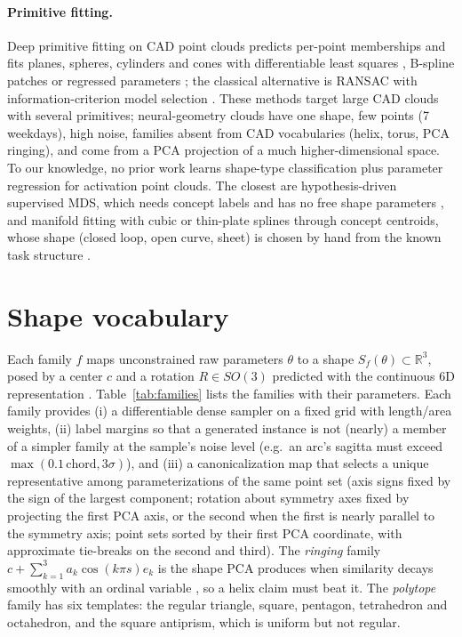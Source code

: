 \documentclass[10pt]{article}
\begin{document}
\paragraph{Primitive fitting.} Deep primitive fitting on CAD point clouds predicts per-point memberships and fits planes, spheres, cylinders and cones with differentiable least squares \citep{li2019spfn}, B-spline patches \citep{sharma2020parsenet} or regressed parameters \citep{yan2021hpnet}; the classical alternative is RANSAC \citep{schnabel2007ransac} with information-criterion model selection \citep{kanatani2004gaic}. These methods target large CAD clouds with several primitives; neural-geometry clouds have one shape, few points (7 weekdays), high noise, families absent from CAD vocabularies (helix, torus, PCA ringing), and come from a PCA projection of a much higher-dimensional space. To our knowledge, no prior work learns shape-type classification plus parameter regression for activation point clouds. The closest are hypothesis-driven supervised MDS, which needs concept labels and has no free shape parameters \citep{tiblias2025smds}, and manifold fitting with cubic or thin-plate splines through concept centroids, whose shape (closed loop, open curve, sheet) is chosen by hand from the known task structure \citep{wurgaft2026manifold}.

\section{Shape vocabulary}
\label{sec:families}
Each family $f$ maps unconstrained raw parameters $\theta$ to a shape $S_f(\theta)\subset\mathbb{R}^3$, posed by a center $c$ and a rotation $R\in SO(3)$ predicted with the continuous 6D representation \citep{zhou2019rotation}. Table~\ref{tab:families} lists the families with their parameters. Each family provides (i) a differentiable dense sampler on a fixed grid with length/area weights, (ii) label margins so that a generated instance is not (nearly) a member of a simpler family at the sample's noise level (e.g.\ an arc's sagitta must exceed $\max(0.1\,\text{chord},3\sigma)$), and (iii) a canonicalization map that selects a unique representative among parameterizations of the same point set (axis signs fixed by the sign of the largest component; rotation about symmetry axes fixed by projecting the first PCA axis, or the second when the first is nearly parallel to the symmetry axis; point sets sorted by their first PCA coordinate, with approximate tie-breaks on the second and third). The \emph{ringing} family $c+\sum_{k=1}^{3}a_k\cos(k\pi s)e_k$ is the shape PCA produces when similarity decays smoothly with an ordinal variable \citep{novembre2008horseshoe,antognini2018walks}, so a helix claim must beat it. The \emph{polytope} family has six templates: the regular triangle, square, pentagon, tetrahedron and octahedron, and the square antiprism, which is uniform but not regular.
\end{document}
